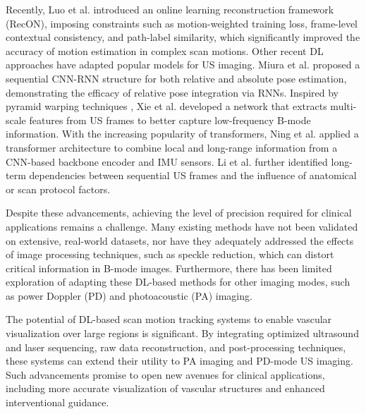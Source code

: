 Recently, Luo et al. \cite{luo_2023_RecO} 
introduced an online learning reconstruction framework (RecON), 
imposing constraints such as motion-weighted training loss, frame-level contextual consistency, 
and path-label similarity, which significantly improved the accuracy of motion estimation 
in complex scan motions. 
Other recent DL approaches have adapted popular models for US imaging. 
Miura et al. \cite{miura_2021_Absolute_pose} proposed a sequential CNN-RNN structure 
for both relative and absolute pose estimation, 
demonstrating the efficacy of relative pose integration via RNNs. 
Inspired by pyramid warping techniques \cite{tehrani_2020_PWC_Net}, 
Xie et al. \cite{xie_2021_PW_Net} developed a network 
that extracts multi-scale features from US frames 
to better capture low-frequency B-mode information. 
With the increasing popularity of transformers, 
Ning et al. \cite{ning_2022_transformer} applied a transformer architecture 
to combine local and long-range information from a CNN-based backbone encoder and IMU sensors. 
Li et al. \cite{li_2023_EfficientNet} further identified long-term dependencies 
between sequential US frames and the influence of anatomical or scan protocol factors.

Despite these advancements, achieving the level of precision required for clinical applications remains a challenge. Many existing methods have not been validated on extensive, real-world datasets, nor have they adequately addressed the effects of image processing techniques, such as speckle reduction, which can distort critical information in B-mode images. Furthermore, there has been limited exploration of adapting these DL-based methods for other imaging modes, such as power Doppler (PD) and photoacoustic (PA) imaging.

The potential of DL-based scan motion tracking systems to enable vascular visualization over large regions is significant. By integrating optimized ultrasound and laser sequencing, raw data reconstruction, and post-processing techniques, these systems can extend their utility to PA imaging and PD-mode US imaging. Such advancements promise to open new avenues for clinical applications, including more accurate visualization of vascular structures and enhanced interventional guidance.